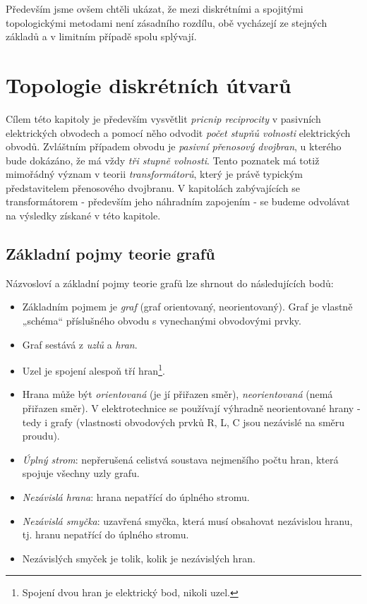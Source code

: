   Především jsme ovšem chtěli ukázat, že mezi diskrétními a spojitými topologickými metodami není
  zásadního rozdílu, obě vycházejí ze stejných základů a v limitním případě spolu splývají. 
  
  \section{Topologie diskrétních útvarů}\label{teo:IchapIIIsecI}
    Cílem této kapitoly je především vysvětlit \emph{pricnip reciprocity} v pasivních elektrických
    obvodech a pomocí něho odvodit \emph{počet stupňů volnosti} elektrických obvodů. Zvláštním
    případem obvodu je \emph{pasivní přenosový dvojbran}, u kterého bude dokázáno, že má vždy
    \emph{tři stupně volnosti}. Tento poznatek má totiž mimořádný význam v teorii
    \emph{transformátorů}, který je právě typickým představitelem přenosového dvojbranu. V
    kapitolách zabývajících se transformátorem - především jeho náhradním zapojením - se budeme
    odvolávat na výsledky získané v této kapitole. 
    
    \subsection{Základní pojmy teorie grafů}\label{teo:IchapIIIsecIsubI}
      Názvosloví a základní pojmy teorie grafů lze shrnout do následujících bodů:
      \begin{itemize}[noitemsep]
        \item Základním pojmem je \emph{graf} (graf orientovaný, neorientovaný). Graf je vlastně
              „schéma“ příslušného obvodu s vynechanými obvodovými prvky.
        \item Graf sestává z \emph{uzlů} a \emph{hran}.
        \item Uzel je spojení alespoň tří hran\footnote{Spojení dvou hran je elektrický bod, 
              nikoli uzel.}.
        \item Hrana může být \emph{orientovaná} (je jí přiřazen směr), \emph{neorientovaná} (nemá
              přiřazen směr). V elektrotechnice se používají výhradně neorientované hrany - tedy i
              grafy (vlastnosti obvodových prvků R, L, C jsou nezávislé na směru proudu).
        \item \emph{Úplný strom}: nepřerušená celistvá soustava nejmenšího počtu hran, která spojuje
              všechny uzly grafu.
        \item \emph{Nezávislá hrana}: hrana nepatřící do úplného stromu.
        \item \emph{Nezávislá smyčka}: uzavřená smyčka, která musí obsahovat nezávislou hranu, tj.
              hranu nepatřící do úplného stromu.
        \item Nezávislých smyček je tolik, kolik je nezávislých hran.
      \end{itemize}
     
